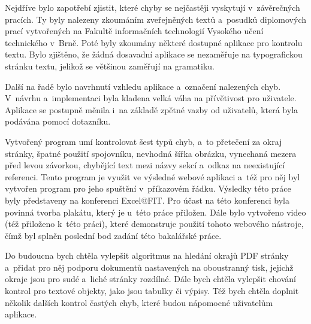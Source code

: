 Nejdříve bylo zapotřebí zjistit, které chyby se nejčastěji vyskytují v~závěrečných
pracích. Ty byly nalezeny zkoumáním zveřejněných textů a~posudků diplomových prací
vytvořených na Fakultě informačních technologií Vysokého učení technického v~Brně.
Poté byly zkoumány některé dostupné aplikace pro kontrolu textu. Bylo zjištěno,
že žádná dosavadní aplikace se nezaměřuje na typografickou stránku textu, jelikož
se většinou zaměřují na gramatiku.

Další na řadě bylo navrhnutí vzhledu aplikace a~označení nalezených chyb.
V~návrhu a~implementaci byla kladena velká váha na přívětivost pro uživatele.
Aplikace se postupně měnila i~na základě zpětné vazby od uživatelů, která byla
podávána pomocí dotazníku.

Vytvořený program umí kontrolovat šest typů chyb, a~to přetečení za okraj stránky, 
špatné použití spojovníku, nevhodná šířka obrázku, vynechaná mezera před levou
závorkou, chybějící text mezi názvy sekcí a~odkaz na neexistující referenci.
Tento program je využit ve výsledné webové aplikaci a~též pro něj byl 
vytvořen program pro jeho spuštění v~příkazovém řádku.
Výsledky této práce byly představeny na konferenci Excel@FIT. Pro
účast na této konferenci byla povinná tvorba plakátu, který je u~této
práce přiložen.
Dále bylo vytvořeno video (též přiloženo k~této práci), které
demonstruje použití tohoto webového nástroje, čímž byl splněn poslední bod
zadání této bakalářské práce.

Do budoucna bych chtěla vylepšit algoritmus na hledání okrajů PDF stránky
a~přidat pro něj podporu dokumentů nastavených na oboustranný tisk, jejichž
okraje jsou pro sudé a~liché stránky rozdílné. Dále bych chtěla vylepšit chování
kontrol pro textové objekty, jako jsou tabulky či výpisy. Též bych chtěla doplnit
několik dalších kontrol častých chyb, které budou nápomocné uživatelům aplikace.






%
